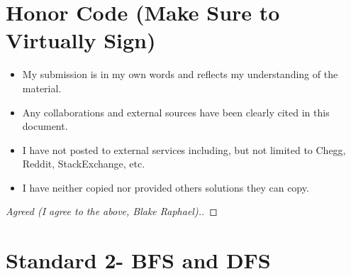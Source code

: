 \documentclass[11pt]{article}
\theoremstyle{definition}
\theoremstyle{definition}
\newtheorem{required}{Problem}
\theoremstyle{definition}
\begin{document}
\section{Honor Code (Make Sure to Virtually Sign)} \label{HonorCode}

\begin{itemize}
\item My submission is in my own words and reflects my understanding of the material.
\item Any collaborations and external sources have been clearly cited in this document.
\item I have not posted to external services including, but not limited to Chegg, Reddit, StackExchange, etc.
\item I have neither copied nor provided others solutions they can copy.
\end{itemize}


\begin{proof}[Agreed (I agree to the above, Blake Raphael).]
\end{proof}

\newpage
\section{Standard 2- BFS and DFS}
\end{document}
